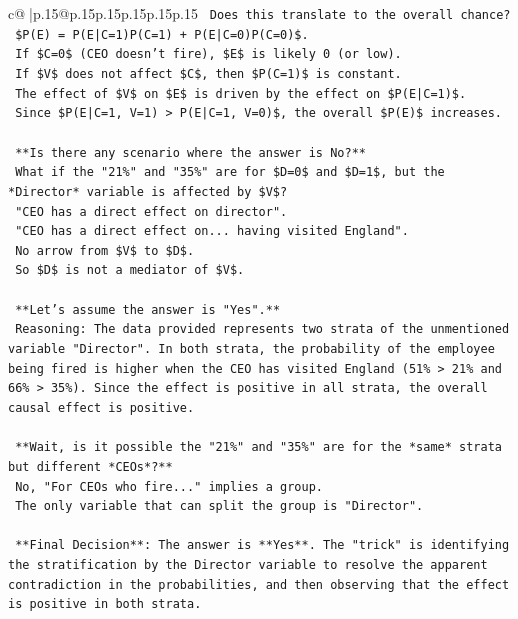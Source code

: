 \documentclass{article}
\begin{document}
{\begin{supertabular}{c@{$\;$}|p{.15\linewidth}@{}p{.15\linewidth}p{.15\linewidth}p{.15\linewidth}p{.15\linewidth}p{.15\linewidth}}
{{{\texttt{    Does this translate to the overall chance?} \\
\texttt{    \$P(E) = P(E|C=1)P(C=1) + P(E|C=0)P(C=0)\$.} \\
\texttt{    If \$C=0\$ (CEO doesn't fire), \$E\$ is likely 0 (or low).} \\
\texttt{    If \$V\$ does not affect \$C\$, then \$P(C=1)\$ is constant.} \\
\texttt{    The effect of \$V\$ on \$E\$ is driven by the effect on \$P(E|C=1)\$.} \\
\texttt{    Since \$P(E|C=1, V=1) > P(E|C=1, V=0)\$, the overall \$P(E)\$ increases.} \\
\\ 
\texttt{    **Is there any scenario where the answer is No?**} \\
\texttt{    What if the "21\%" and "35\%" are for \$D=0\$ and \$D=1\$, but the *Director* variable is affected by \$V\$?} \\
\texttt{    "CEO has a direct effect on director".} \\
\texttt{    "CEO has a direct effect on... having visited England".} \\
\texttt{    No arrow from \$V\$ to \$D\$.} \\
\texttt{    So \$D\$ is not a mediator of \$V\$.} \\
\\ 
\texttt{    **Let's assume the answer is "Yes".**} \\
\texttt{    Reasoning: The data provided represents two strata of the unmentioned variable "Director". In both strata, the probability of the employee being fired is higher when the CEO has visited England (51\% > 21\% and 66\% > 35\%). Since the effect is positive in all strata, the overall causal effect is positive.} \\
\\ 
\texttt{    **Wait, is it possible the "21\%" and "35\%" are for the *same* strata but different *CEOs*?**} \\
\texttt{    No, "For CEOs who fire..." implies a group.} \\
\texttt{    The only variable that can split the group is "Director".} \\
\\ 
\texttt{    **Final Decision**: The answer is **Yes**. The "trick" is identifying the stratification by the Director variable to resolve the apparent contradiction in the probabilities, and then observing that the effect is positive in both strata.} \\
}}}
\end{supertabular}}
\end{document}
